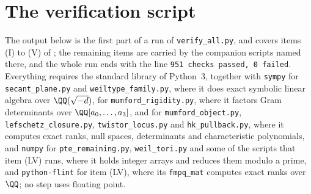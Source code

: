 \section{The verification script}\label{app:scripts}

The output below is the first part of a run of \texttt{verify\_all.py}, and
covers items (I) to (V) of ; the remaining items are
carried by the companion scripts named there, and the whole run ends with the
line \texttt{951 checks passed, 0 failed}. Everything requires the standard library of Python~3,
together with \texttt{sympy} for \texttt{secant\_plane.py} and
\texttt{weiltype\_family.py}, where it does exact symbolic linear algebra over
$\QQ(\sqrt{-d})$, for \texttt{mumford\_rigidity.py}, where it factors
Gram determinants over $\QQ[a_{0},\dots,a_{3}]$, and for
\texttt{mumford\_object.py}, \texttt{lefschetz\_closure.py},
\texttt{twistor\_locus.py} and \texttt{hk\_pullback.py}, where it computes
exact ranks, null spaces, determinants and characteristic polynomials, and
\texttt{numpy} for \texttt{pte\_remaining.py}, \texttt{weil\_tori.py} and
some of the scripts that item (LV) runs, where it holds integer arrays and
reduces them modulo a prime, and \texttt{python-flint} for item (LV), where its
\texttt{fmpq\_mat} computes exact ranks over $\QQ$; no step uses floating
point.

